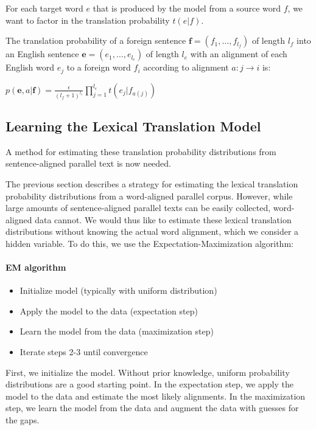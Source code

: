 \documentclass[10pt]{report}
\theoremstyle{plain}
\begin{document}
{For each target word $e$ that is produced by the model from a source
word $f$, we want to factor in the translation probability $t(e|f)$.

The translation probability of a foreign sentence
$\textbf{f}=(f_1,\dots,f_{l_f})$ of length $l_f$ into an English
sentence $\textbf{e}=(e_1,\dots, e_{l_e})$ of length $l_e$ with an
alignment of each English word $e_j$ to a foreign word $f_i$
according to alignment $a:j \rightarrow i$ is:

\begin{center}
$p(\textbf{e},a|\textbf{f}) = \frac{\epsilon}{(l_f +
1)^{l_e}}\prod_{j=1}^{l_e} t(e_j|f_{a(j)})$
\end{center}


\subsection{Learning the Lexical Translation Model}

A method for estimating these translation probability distributions
from sentence-aligned parallel text is now needed.

The previous section describes a strategy for estimating the lexical
translation probability distributions from a word-aligned parallel
corpus. However, while large amounts of sentence-aligned parallel
texts can be easily collected, word-aligned data cannot. We would
thus like to estimate these lexical translation distributions
without knowing the actual word alignment, which we consider a
hidden variable. To do this, we use the Expectation-Maximization
algorithm:

\paragraph{EM algorithm}
\begin{itemize}
\item{Initialize model (typically with uniform distribution)}
\item{Apply the model to the data (expectation step)}
\item{Learn the model from the data (maximization step)}
\item{Iterate steps 2-3 until convergence}
\end{itemize}

First, we initialize the model. Without prior knowledge, uniform
probability distributions are a good starting point. In the
expectation step, we apply the model to the data and estimate the
most likely alignments. In the maximization step, we learn the model
from the data and augment the data with guesses for the gaps.

}
\end{document}
